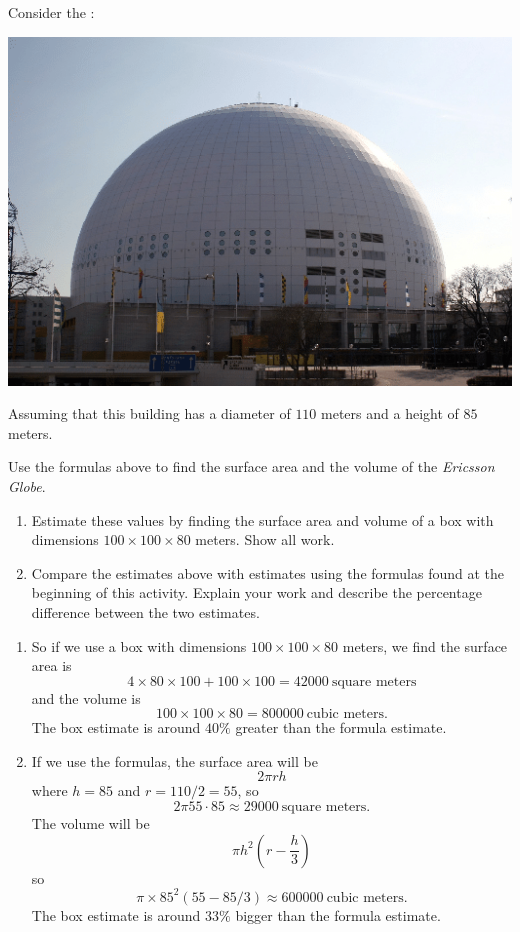 \documentclass[handout,nooutcomes,noauthor,hints]{ximera}
\begin{document}
\begin{question} \label{FG1:1}
  Consider the :
   \begin{center}
    \includegraphics[width=.4\textwidth]{dome.png} %
   \end{center}
   Assuming that this building has a diameter of $110$ meters and a
   height of $85$ meters.
   
   Use the formulas above to find the surface area
   and the volume of the \textit{Ericsson Globe}.
\begin{enumerate}
\item Estimate these values by finding the surface area and volume of
  a box with dimensions $100\times 100 \times 80$ meters. Show all work.
\item Compare the estimates above with estimates using the formulas
  found at the beginning of this activity. Explain your work and
  describe the percentage difference between the two estimates.
\end{enumerate}
\begin{freeResponse}
  \begin{enumerate}
  \item So if we use a box with dimensions $100\times 100 \times 80$ meters,
    we find the surface area is
    \[
    4\times 80 \times 100 +100\times 100= 42000~\text{square meters}
    \]
    and the volume is
    \[
    100\times 100 \times 80 = 800000~\text{cubic meters.}
    \]
    The box estimate is around $40\%$ greater than the formula
    estimate.
  \item If we use the formulas, the surface area will be
    \[
    2\pi rh
    \]
    where $h=85$ and $r= 110/2 = 55$, so
    \[
    2\pi 55\cdot 85 \approx  29000~\text{square meters}.
    \]
    The volume will be
    \[
    \pi h^2 \left( r- \frac{h}{3}\right)
    \]
    so
    \[
    \pi \times 85^2 (55 - 85/3) \approx 600000 ~\text{cubic meters.}
    \]
    The box estimate is around $33\%$ bigger than the formula
    estimate.
  \end{enumerate}
\end{freeResponse}
   \end{question}
\mynewpage
\end{document}
